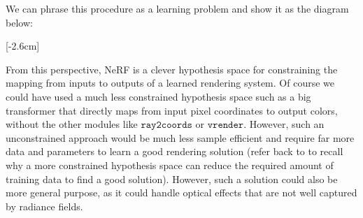 We can phrase this procedure as a learning problem and show it as the diagram below:
\begin{center}
\end{center}
[-2.6cm]


From this perspective, NeRF is a clever hypothesis space for constraining the mapping from inputs to outputs of a learned rendering system. Of course we could have used a much less constrained hypothesis space such as a big transformer that directly maps from input pixel coordinates to output colors, without the other modules like $\texttt{ray2coords}$ or $\texttt{vrender}$. However, such an unconstrained approach would be much less sample efficient and require far more data and parameters to learn a good rendering solution (refer back to \chap{\ref{chapter:problem_of_generalization}} to recall why a more constrained hypothesis space can reduce the required amount of training data to find a good solution). However, such a solution could also be more general purpose, as it could handle optical effects that are not well captured by radiance fields.


